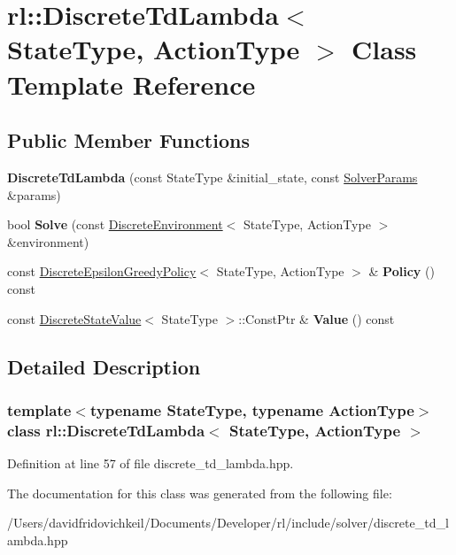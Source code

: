 \hypertarget{classrl_1_1_discrete_td_lambda}{}\section{rl\+:\+:Discrete\+Td\+Lambda$<$ State\+Type, Action\+Type $>$ Class Template Reference}
\label{classrl_1_1_discrete_td_lambda}
\subsection*{Public Member Functions}
\begin{DoxyCompactItemize}
\item 
\hypertarget{classrl_1_1_discrete_td_lambda_a899c3819e15973a6d78c0606c5f3dfb8}{}\label{classrl_1_1_discrete_td_lambda_a899c3819e15973a6d78c0606c5f3dfb8} 
{\bfseries Discrete\+Td\+Lambda} (const State\+Type \&initial\+\_\+state, const \hyperlink{structrl_1_1_solver_params}{Solver\+Params} \&params)
\item 
\hypertarget{classrl_1_1_discrete_td_lambda_a9458f4514c9cabe6083d54f7d9d195d4}{}\label{classrl_1_1_discrete_td_lambda_a9458f4514c9cabe6083d54f7d9d195d4} 
bool {\bfseries Solve} (const \hyperlink{classrl_1_1_discrete_environment}{Discrete\+Environment}$<$ State\+Type, Action\+Type $>$ \&environment)
\item 
\hypertarget{classrl_1_1_discrete_td_lambda_a2415e7f327ed838cac5d792d95dc1cb7}{}\label{classrl_1_1_discrete_td_lambda_a2415e7f327ed838cac5d792d95dc1cb7} 
const \hyperlink{classrl_1_1_discrete_epsilon_greedy_policy}{Discrete\+Epsilon\+Greedy\+Policy}$<$ State\+Type, Action\+Type $>$ \& {\bfseries Policy} () const
\item 
\hypertarget{classrl_1_1_discrete_td_lambda_a54cc20c528c84989545d8b79dd12ebfd}{}\label{classrl_1_1_discrete_td_lambda_a54cc20c528c84989545d8b79dd12ebfd} 
const \hyperlink{structrl_1_1_discrete_state_value}{Discrete\+State\+Value}$<$ State\+Type $>$\+::Const\+Ptr \& {\bfseries Value} () const
\end{DoxyCompactItemize}


\subsection{Detailed Description}
\subsubsection*{template$<$typename State\+Type, typename Action\+Type$>$\newline
class rl\+::\+Discrete\+Td\+Lambda$<$ State\+Type, Action\+Type $>$}



Definition at line 57 of file discrete\+\_\+td\+\_\+lambda.\+hpp.



The documentation for this class was generated from the following file\+:\begin{DoxyCompactItemize}
\item 
/\+Users/davidfridovichkeil/\+Documents/\+Developer/rl/include/solver/discrete\+\_\+td\+\_\+lambda.\+hpp\end{DoxyCompactItemize}

